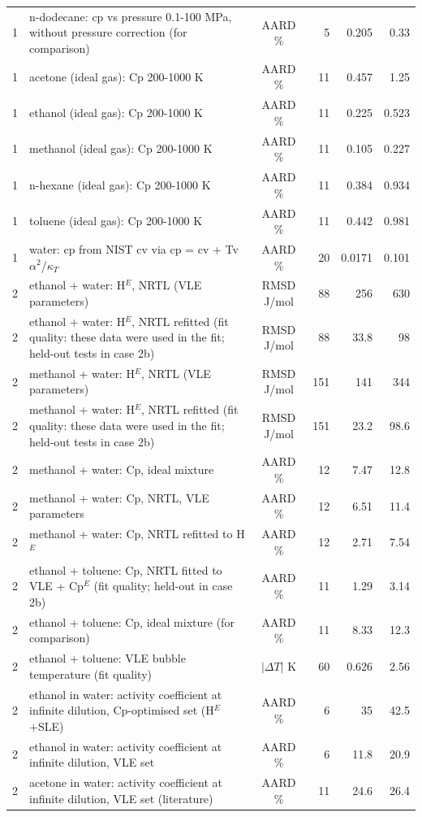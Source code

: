 \begin{tabular}{c p{8.6cm} c r r r}
1 & n-dodecane: cp vs pressure 0.1-100 MPa, without pressure correction (for comparison) & AARD \% & 5 & 0.205 & 0.33 \\
1 & acetone (ideal gas): Cp 200-1000 K & AARD \% & 11 & 0.457 & 1.25 \\
1 & ethanol (ideal gas): Cp 200-1000 K & AARD \% & 11 & 0.225 & 0.523 \\
1 & methanol (ideal gas): Cp 200-1000 K & AARD \% & 11 & 0.105 & 0.227 \\
1 & n-hexane (ideal gas): Cp 200-1000 K & AARD \% & 11 & 0.384 & 0.934 \\
1 & toluene (ideal gas): Cp 200-1000 K & AARD \% & 11 & 0.442 & 0.981 \\
1 & water: cp from NIST cv via cp = cv + Tv$\alpha^2$/$\kappa_T$ & AARD \% & 20 & 0.0171 & 0.101 \\
2 & ethanol + water: H$^E$, NRTL (VLE parameters) & RMSD J/mol & 88 & 256 & 630 \\
2 & ethanol + water: H$^E$, NRTL refitted (fit quality: these data were used in the fit; held-out tests in case 2b) & RMSD J/mol & 88 & 33.8 & 98 \\
2 & methanol + water: H$^E$, NRTL (VLE parameters) & RMSD J/mol & 151 & 141 & 344 \\
2 & methanol + water: H$^E$, NRTL refitted (fit quality: these data were used in the fit; held-out tests in case 2b) & RMSD J/mol & 151 & 23.2 & 98.6 \\
2 & methanol + water: Cp, ideal mixture & AARD \% & 12 & 7.47 & 12.8 \\
2 & methanol + water: Cp, NRTL, VLE parameters & AARD \% & 12 & 6.51 & 11.4 \\
2 & methanol + water: Cp, NRTL refitted to H$^E$ & AARD \% & 12 & 2.71 & 7.54 \\
2 & ethanol + toluene: Cp, NRTL fitted to VLE + Cp$^E$ (fit quality; held-out in case 2b) & AARD \% & 11 & 1.29 & 3.14 \\
2 & ethanol + toluene: Cp, ideal mixture (for comparison) & AARD \% & 11 & 8.33 & 12.3 \\
2 & ethanol + toluene: VLE bubble temperature (fit quality) & $|\Delta T|$ K & 60 & 0.626 & 2.56 \\
2 & ethanol in water: activity coefficient at infinite dilution, Cp-optimised set (H$^E$+SLE) & AARD \% & 6 & 35 & 42.5 \\
2 & ethanol in water: activity coefficient at infinite dilution, VLE set & AARD \% & 6 & 11.8 & 20.9 \\
2 & acetone in water: activity coefficient at infinite dilution, VLE set (literature) & AARD \% & 11 & 24.6 & 26.4 \\

\end{tabular}
